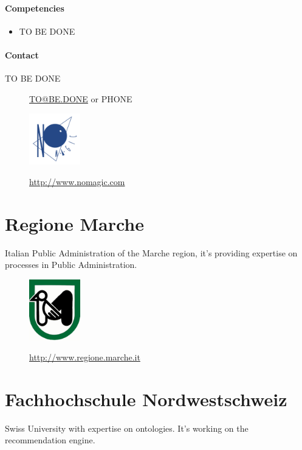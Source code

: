\documentclass{learnpad}
\begin{document}
\paragraph{Competencies}
\begin{itemize}
	\item TO BE DONE
\end{itemize}

\paragraph{Contact}
\begin{description}
	\item[TO BE DONE] \href{mailto:TO@BE.DONE}{TO@BE.DONE} or PHONE
\end{description}

\begin{figure}[!htp]
	\centering
	\includegraphics[width=6em,keepaspectratio]{figures/nme.png}\par
	\url{http://www.nomagic.com}
\end{figure}

\section{Regione Marche}
Italian Public Administration of the Marche region, it's providing expertise on
processes in Public Administration.

\begin{figure}[!htp]
	\centering
	\includegraphics[width=6em,keepaspectratio]{figures/marche.jpg}\par
	\url{http://www.regione.marche.it}
\end{figure}

\section{Fachhochschule Nordwestschweiz}
Swiss University with expertise on ontologies.  It's working on the
recommendation engine.
\end{document}

